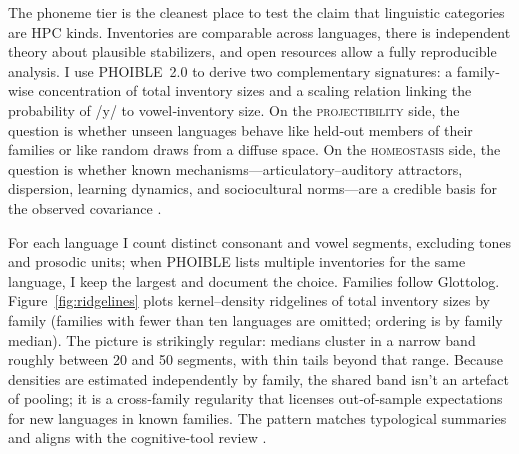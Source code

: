 \documentclass[12pt]{article}
\begin{document}
The phoneme tier is the cleanest place to test the claim that linguistic categories are HPC kinds. Inventories are comparable across languages, there is independent theory about plausible stabilizers, and open resources allow a fully reproducible analysis. I use PHOIBLE~2.0 \citep{MoranEtAl2019PHOIBLE} to derive two complementary signatures: a family‐wise concentration of total inventory sizes and a scaling relation linking the probability of /y/ to vowel‐inventory size. On the \textsc{projectibility} side, the question is whether unseen languages behave like held‐out members of their families or like random draws from a diffuse space. On the \textsc{homeostasis} side, the question is whether known mechanisms—articulatory–auditory attractors, dispersion, learning dynamics, and sociocultural norms—are a credible basis for the observed covariance \citep{Stevens1989Quantal,LiljencrantsLindblom1972,Lindblom1990HandH,Ekstrom2025PhonemeTool}.

For each language I count distinct consonant and vowel segments, excluding tones and prosodic units; when PHOIBLE lists multiple inventories for the same language, I keep the largest and document the choice. Families follow Glottolog. Figure~\ref{fig:ridgelines} plots kernel–density ridgelines of total inventory sizes by family (families with fewer than ten languages are omitted; ordering is by family median). The picture is strikingly regular: medians cluster in a narrow band roughly between 20 and 50 segments, with thin tails beyond that range. Because densities are estimated independently by family, the shared band isn't an artefact of pooling; it is a cross‐family regularity that licenses out‐of‐sample expectations for new languages in known families. The pattern matches typological summaries and aligns with the cognitive-tool review \citep[Fig.\,1]{Ekstrom2025PhonemeTool}.
\end{document}
